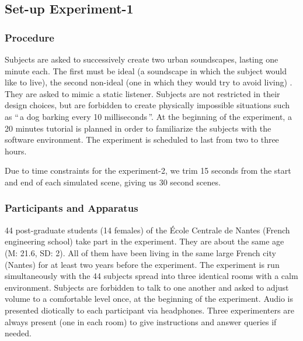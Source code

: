 \documentclass[twoside,twocolumn]{article}
\begin{document}

\subsection{Set-up Experiment-1}
\subsubsection*{Procedure}

Subjects are asked to successively create two urban soundscapes, lasting one minute each. The first must be ideal (a soundscape in which the subject would like to live), the second non-ideal (one in which they would try to avoid living)  . They are asked to mimic a static listener. Subjects are not restricted in their design choices, but are forbidden to create physically impossible situations such as ``\,a dog barking every 10 milliseconds\,''. At the beginning of the experiment, a 20 minutes tutorial is planned in order to familiarize the subjects with the software environment. The experiment is scheduled to last from two to three hours.

Due to time constraints for the experiment-2, we trim 15 seconds from the start and end of each simulated scene, giving us 30 second scenes.

\subsubsection*{Participants and Apparatus}

44 post-graduate students (14 females) of the {\'E}cole Centrale de Nantes (French engineering school) take part in the experiment. They are about the same age (M: 21.6, SD: 2). All of them have been living in the same large French city (Nantes) for at least two years before the experiment. The experiment is run simultaneously with the 44 subjects spread into three identical rooms with a calm environment. Subjects are forbidden to talk to one another and asked to adjust volume to a comfortable level once, at the beginning of the experiment. Audio is presented diotically to each participant via headphones. Three experimenters are always present (one in each room) to give instructions and answer queries if needed.
\end{document}
